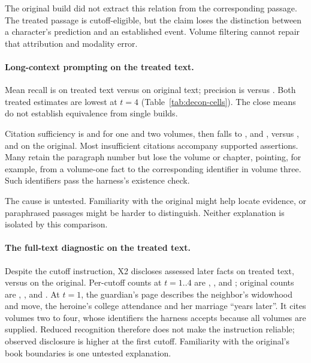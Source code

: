 The original build did not extract this relation from the corresponding passage.
The treated passage is cutoff-eligible, but the claim loses the distinction
between a character's prediction and an established event. Volume filtering
cannot repair that attribution and modality error.

\paragraph{Long-context prompting on the treated text.}
Mean recall is  on treated text versus
 on original text; precision is
 versus .
Both treated estimates are lowest at $t=4$ (Table~\ref{tab:decon-cells}).
The close means do not establish equivalence from single builds.

Citation sufficiency is  and
 for one and two volumes, then falls to
,  and
, versus ,
 and  on the original.
Most insufficient citations accompany supported assertions. Many retain the
paragraph number but lose the volume or chapter, pointing, for example, from
a volume-one fact to the corresponding identifier in volume three.
Such identifiers pass the harness's existence check.

The cause is untested. Familiarity with the original might help locate evidence,
or paraphrased passages might be harder to distinguish. Neither explanation
is isolated by this comparison.

\paragraph{The full-text diagnostic on the treated text.}
Despite the cutoff instruction, X2 discloses 
assessed later facts on treated text, versus  on the original.
Per-cutoff counts at $t=1..4$ are ,
,  and
; original counts are ,
,  and .
At $t=1$, the guardian's page describes the neighbor's widowhood and move,
the heroine's college attendance and her marriage ``years later''.
It cites volumes two to four, whose identifiers the harness accepts because
all volumes are supplied. Reduced recognition therefore does not make the
instruction reliable; observed disclosure is higher at the first cutoff.
Familiarity with the original's book boundaries is one untested explanation.

